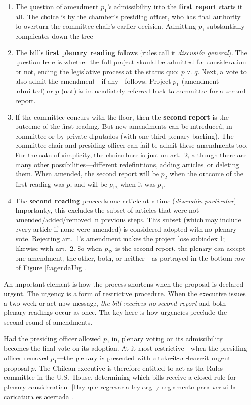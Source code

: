 \documentclass[letter,12pt]{article}
\begin{document}
\begin{enumerate}
\item The question of amendment $p_1$'s admissibility into the \textbf{first report} starts it all. The choice is by the chamber's presiding officer, who has final authority to overturn the committee chair's earlier decision. Admitting $p_1$ substantially complicates down the tree. 
\item The bill's \textbf{first plenary reading} follows (rules call it \emph{discusi\'on general}). The question here is whether the full project should be admitted for consideration or not, ending the legislative process at the status quo: $p$ v. $q$. Next, a vote to also admit the amendment---if any---follows. Project $p_1$ (amendment admitted) or $p$ (not) is immeadiately referred back to committee for a second report. 
\item If the committee concurs with the floor, then the \textbf{second report} is the outcome of the first reading. But new amendments can be introduced, in committee or by private diputados (with one-third plenary backing). The committee chair and presiding officer can fail to admit these amendments too. For the sake of simplicity, the choice here is just on art.\ 2, although there are many other possibilities---different redefinitions, adding articles, or deleting them. When amended, the second report will be $p_2$ when the outcome of the first reading was $p$, and will be $p_{12}$ when it was $p_1$. 
\item The \textbf{second reading} proceeds one article at a time (\emph{discusi\'on particular}). Importantly, this excludes the subset of articles that were not amended/added/removed in previous steps. This subset (which may include every article if none were amended) is considered adopted with no plenary vote. Rejecting art.\ 1's amendment makes the project lose subindex 1; likewise with art.\ 2. So when $p_{12}$ is the second report, the plenary can accept one amendment, the other, both, or neither---as portrayed in the bottom row of Figure \ref{f:agendaUrg}. 
\end{enumerate}

An important element is how the process shortens when the proposal is declared urgent. The urgency is a form of restrictive procedure. When the executive issues a two week or act now message, \emph{the bill receives no second report} and both plenary readings occur at once. The key here is how urgencies preclude the second round of amendments. 

Had the presiding officer allowed $p_1$ in, plenary voting on its admissibility becomes the final vote on its adoption. At it most restrictive---when the presiding officer removed $p_1$---the plenary is presented with a take-it-or-leave-it urgent proposal $p$. The Chilean executive is therefore entitled to act as the Rules committee in the U.S.\ House, determining which bills receive a closed rule for plenary consideration. [Hay que regresar a ley org. y reglamento para ver si la caricatura es acertada]. 
\end{document}
